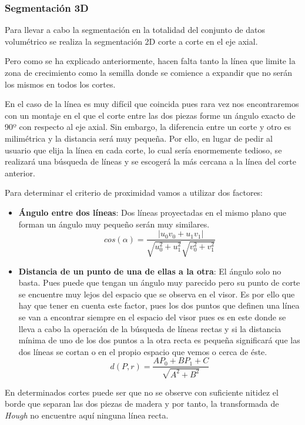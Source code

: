 \subsubsection{Segmentación 3D}

Para llevar a cabo la segmentación en la totalidad del conjunto de datos volumétrico se realiza la segmentación 2D corte a corte en el eje axial.

Pero como se ha explicado anteriormente, hacen falta tanto la línea que limite la zona de crecimiento como la semilla donde se comience a expandir que no serán los mismos en todos los cortes.

En el caso de la línea es muy difícil que coincida pues rara vez nos encontraremos con un montaje en el que el corte entre las dos piezas forme un ángulo exacto de 90º con respecto al eje axial. Sin embargo, la diferencia entre un corte y otro es milimétrica y la distancia será muy pequeña. Por ello, en lugar de pedir al usuario que elija la línea en cada corte, lo cual sería enormemente tedioso, se realizará una búsqueda de líneas y se escogerá la más cercana a la línea del corte anterior.

Para determinar el criterio de proximidad vamos a utilizar dos factores:

\begin{itemize}
	\item \textbf{Ángulo entre dos líneas}: Dos líneas proyectadas en el mismo plano que forman un ángulo muy pequeño serán muy similares.
	$$ cos(\alpha) = \frac{|u_0 v_0 + u_1 v_1|}{\sqrt{u_0^2 + u_1^2}\sqrt{v_0^2 + v_1^2}} $$
	\item \textbf{Distancia de un punto de una de ellas a la otra}: El ángulo solo no basta. Pues puede que tengan un ángulo muy parecido pero su punto de corte se encuentre muy lejos del espacio que se observa en el visor. Es por ello que hay que tener en cuenta este factor, pues los dos puntos que definen una línea se van a encontrar siempre en el espacio del visor pues es en este donde se lleva a cabo la operación de la búsqueda de líneas rectas y si la distancia mínima de uno de los dos puntos a la otra recta es pequeña significará que las dos líneas se cortan o en el propio espacio que vemos o cerca de éste.
	$$ d(P, r) = \frac{A P_0 + B P_1 + C}{\sqrt{A^2 + B^2}} $$
\end{itemize}

En determinados cortes puede ser que no se observe con suficiente nitidez el borde que separan las dos piezas de madera y por tanto, la transformada de \textit{Hough} no encuentre aquí ninguna línea recta.

